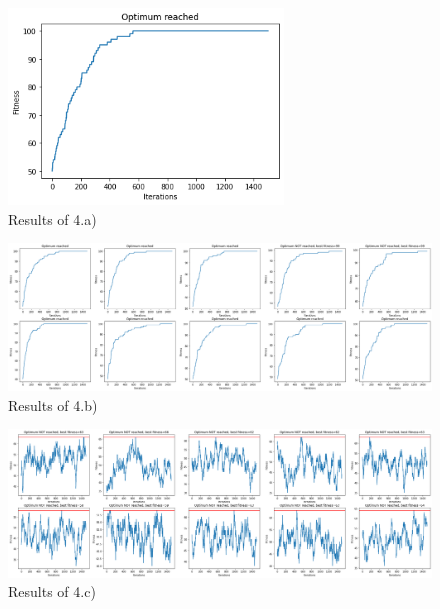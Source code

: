 \documentclass{scrartcl}
\begin{document}
\begin{figure}[!ht]
    \centering
    \includegraphics[width=0.65\textwidth]{4/output_a.png}
    \caption{Results of 4.a)}
    \label{a}
\end{figure}
\begin{figure}[!ht]
    \centering
    \includegraphics[width=\textwidth]{4/output_b.png}
    \caption{Results of 4.b)}
    \label{b}
\end{figure}
\begin{figure}[!ht]
    \centering
    \includegraphics[width=\textwidth]{4/output_c.png}
    \caption{Results of 4.c)}
    \label{c}

\end{figure}
\end{document}
